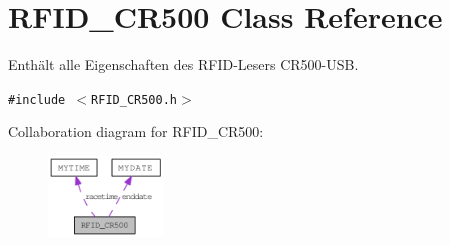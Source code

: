 \hypertarget{class_r_f_i_d___c_r500}{
\section{RFID\_\-CR500 Class Reference}
\label{class_r_f_i_d___c_r500}
}
Enthält alle Eigenschaften des RFID-Lesers CR500-USB.  


{\tt \#include $<$RFID\_\-CR500.h$>$}

Collaboration diagram for RFID\_\-CR500:\nopagebreak
\begin{figure}[H]
\begin{center}
\leavevmode
\includegraphics[width=86pt]{class_r_f_i_d___c_r500__coll__graph}
\end{center}
\end{figure}
